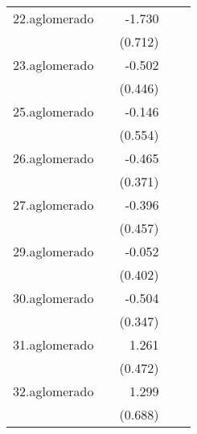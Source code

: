 {\begin{longtable}{l*{4}{D{.}{.}{-1}}}
\addlinespace
22.aglomerado&                     &      -1.730\sym{*}  &                     &                     \\
            &                     &     (0.712)         &                     &                     \\
\addlinespace
23.aglomerado&                     &      -0.502         &                     &                     \\
            &                     &     (0.446)         &                     &                     \\
\addlinespace
25.aglomerado&                     &      -0.146         &                     &                     \\
            &                     &     (0.554)         &                     &                     \\
\addlinespace
26.aglomerado&                     &      -0.465         &                     &                     \\
            &                     &     (0.371)         &                     &                     \\
\addlinespace
27.aglomerado&                     &      -0.396         &                     &                     \\
            &                     &     (0.457)         &                     &                     \\
\addlinespace
29.aglomerado&                     &      -0.052         &                     &                     \\
            &                     &     (0.402)         &                     &                     \\
\addlinespace
30.aglomerado&                     &      -0.504         &                     &                     \\
            &                     &     (0.347)         &                     &                     \\
\addlinespace
31.aglomerado&                     &       1.261\sym{**} &                     &                     \\
            &                     &     (0.472)         &                     &                     \\
\addlinespace
32.aglomerado&                     &       1.299         &                     &                     \\
            &                     &     (0.688)         &                     &                     \\

\end{longtable}}
